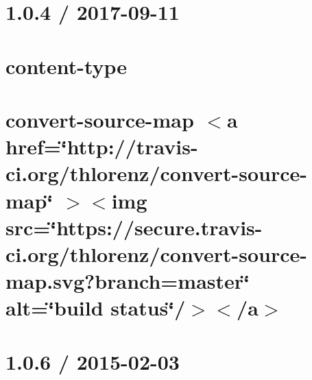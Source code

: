 \documentclass[twoside]{book}
\newcommand{\+}{\discretionary{\mbox{\scriptsize$\hookleftarrow$}}{}{}}
\begin{document}
\chapter{1.0.4 / 2017-\/09-\/11}
\label{md__c___users_vaishnavi_jadhav__desktop__developer_code_mean_stack_example_client_node_modules_content_type__h_i_s_t_o_r_y}

\chapter{content-\/type}
\label{md__c___users_vaishnavi_jadhav__desktop__developer_code_mean_stack_example_client_node_modules_content_type__r_e_a_d_m_e}

\chapter{convert-\/source-\/map \texorpdfstring{$<$}{<}a href=\char`\"{}http\+://travis-\/ci.\+org/thlorenz/convert-\/source-\/map\char`\"{} \texorpdfstring{$>$}{>}\texorpdfstring{$<$}{<}img src=\char`\"{}https\+://secure.\+travis-\/ci.\+org/thlorenz/convert-\/source-\/map.\+svg?branch=master\char`\"{} alt=\char`\"{}build status\char`\"{}/\texorpdfstring{$>$}{>}\texorpdfstring{$<$}{<}/a\texorpdfstring{$>$}{>}}
\label{md__c___users_vaishnavi_jadhav__desktop__developer_code_mean_stack_example_client_node_modules_convert_source_map__r_e_a_d_m_e}

\chapter{1.0.6 / 2015-\/02-\/03}
\label{md__c___users_vaishnavi_jadhav__desktop__developer_code_mean_stack_example_client_node_modules_cookie_signature__history}

\end{document}
